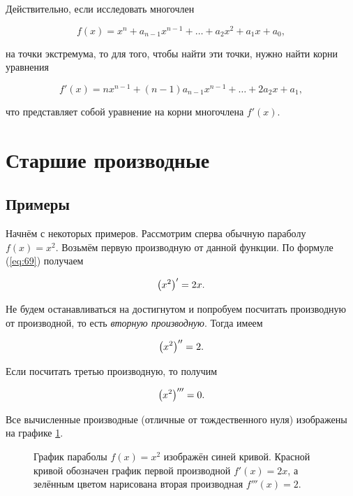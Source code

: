 \documentclass[12pt]{article}
\begin{document}
\par
Действительно, если исследовать многочлен

\begin{equation}
	f(x) = x^n + a_{n-1}x^{n-1} + \ldots + a_2 x^2 + a_1 x + a_0,
\end{equation}

на точки экстремума, то для того, чтобы найти эти точки, нужно найти корни уравнения

\begin{equation}
	f'(x) = n x^{n-1} + (n-1)a_{n-1}x^{n-1} + \ldots + 2 a_2 x + a_1,
\end{equation}

что представляет собой уравнение на корни многочлена $f'(x)$.

\section{Старшие производные}
\subsection{Примеры}
Начнём с некоторых примеров. Рассмотрим сперва обычную параболу $f(x) = x^2$. Возьмём первую производную от данной функции. По формуле (\ref{eq:69}) получаем

\begin{equation}
	\qty(x^2)' = 2 x.
\end{equation}

Не будем останавливаться на достигнутом и попробуем посчитать производную от производной, то есть \emph{вторную производную}. Тогда имеем

\begin{equation}
	\qty(x^2)'' = 2.
\end{equation}

Если посчитать третью производную, то получим

\begin{equation}
	\qty(x^2)''' = 0.
\end{equation}

Все вычисленные производные (отличные от тождественного нуля) изображены на графике \ref{fig:69}.

\begin{figure}[htbp]
\centering
{}
\caption{График параболы $f(x) = x^2$ изображён синей кривой. Красной кривой обозначен график первой производной $f'(x) = 2x$, а зелённым цветом нарисована вторая производная $f'''(x)=2$.}
\label{fig:69}
\end{figure}
\end{document}

